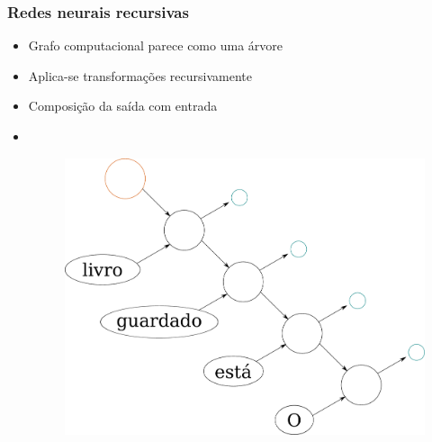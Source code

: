 \documentclass[10pt]{beamer}
\begin{document}
\begin{frame}[fragile]
  \frametitle{Redes neurais recursivas}

  \begin{itemize}
    \item Grafo computacional parece como uma árvore
  
    \item Aplica-se transformações recursivamente



    \item Composição da saída com entrada

    \item[\ ] \ 

    \begin{figure}
      \begin{center}
        \includegraphics[scale=0.25]{img/redeneuralrecursiva.pdf}
      \end{center}
    \end{figure}


  \end{itemize}

\end{frame}
\end{document}

